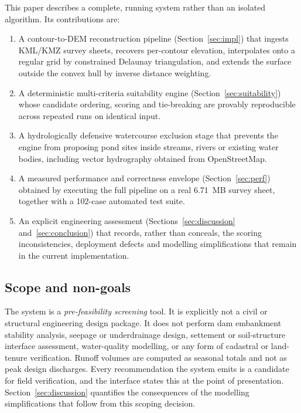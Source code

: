 \documentclass[sigconf,review,10pt]{acmart}
\begin{document}
This paper describes a complete, running system rather than an isolated
algorithm. Its contributions are:

\begin{enumerate}
  \item A contour-to-DEM reconstruction pipeline (Section~\ref{sec:impl})
  that ingests KML/KMZ survey sheets, recovers per-contour elevation,
  interpolates onto a regular grid by constrained Delaunay triangulation,
  and extends the surface outside the convex hull by inverse distance
  weighting.
  \item A deterministic multi-criteria suitability engine
  (Section~\ref{sec:suitability}) whose candidate ordering, scoring and
  tie-breaking are provably reproducible across repeated runs on
  identical input.
  \item A hydrologically defensive watercourse exclusion stage that
  prevents the engine from proposing pond sites inside streams, rivers or
  existing water bodies, including vector hydrography obtained from
  OpenStreetMap.
  \item A measured performance and correctness envelope
  (Section~\ref{sec:perf}) obtained by executing the full pipeline on a
  real 6.71~MB survey sheet, together with a 102-case automated test
  suite.
  \item An explicit engineering assessment (Sections~\ref{sec:discussion}
  and~\ref{sec:conclusion}) that records, rather than conceals, the
  scoring inconsistencies, deployment defects and modelling simplifications
  that remain in the current implementation.
\end{enumerate}

\subsection{Scope and non-goals}

The system is a \emph{pre-feasibility screening} tool. It is explicitly
not a civil or structural engineering design package. It does not perform
dam embankment stability analysis, seepage or underdrainage design,
settement or soil-structure interface assessment, water-quality modelling,
or any form of cadastral or land-tenure verification. Runoff volumes are
computed as seasonal totals and not as peak design discharges. Every
recommendation the system emits is a candidate for field verification, and
the interface states this at the point of presentation. Section~\ref{sec:discussion}
quantifies the consequences of the modelling simplifications that follow
from this scoping decision.
\end{document}
